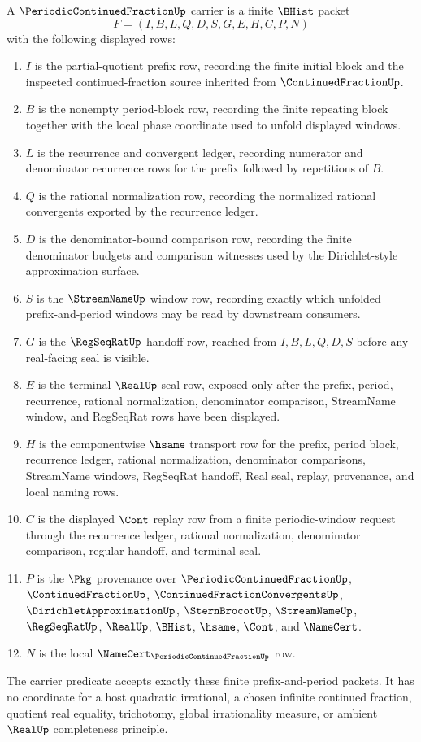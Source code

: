 \begin{definition}
\label{def:periodic-continued-fraction-carrier}
A $\PeriodicContinuedFractionUp$ carrier is a finite $\BHist$ packet
$$
F=(I,B,L,Q,D,S,G,E,H,C,P,N)
$$
with the following displayed rows:
\begin{enumerate}
\item $I$ is the partial-quotient prefix row, recording the finite initial block and the inspected continued-fraction source inherited from $\ContinuedFractionUp$.
\item $B$ is the nonempty period-block row, recording the finite repeating block together with the local phase coordinate used to unfold displayed windows.
\item $L$ is the recurrence and convergent ledger, recording numerator and denominator recurrence rows for the prefix followed by repetitions of $B$.
\item $Q$ is the rational normalization row, recording the normalized rational convergents exported by the recurrence ledger.
\item $D$ is the denominator-bound comparison row, recording the finite denominator budgets and comparison witnesses used by the Dirichlet-style approximation surface.
\item $S$ is the $\StreamNameUp$ window row, recording exactly which unfolded prefix-and-period windows may be read by downstream consumers.
\item $G$ is the $\RegSeqRatUp$ handoff row, reached from $I,B,L,Q,D,S$ before any real-facing seal is visible.
\item $E$ is the terminal $\RealUp$ seal row, exposed only after the prefix, period, recurrence, rational normalization, denominator comparison, StreamName window, and RegSeqRat rows have been displayed.
\item $H$ is the componentwise $\hsame$ transport row for the prefix, period block, recurrence ledger, rational normalization, denominator comparisons, StreamName windows, RegSeqRat handoff, Real seal, replay, provenance, and local naming rows.
\item $C$ is the displayed $\Cont$ replay row from a finite periodic-window request through the recurrence ledger, rational normalization, denominator comparison, regular handoff, and terminal seal.
\item $P$ is the $\Pkg$ provenance over $\PeriodicContinuedFractionUp$, $\ContinuedFractionUp$, $\ContinuedFractionConvergentsUp$, $\DirichletApproximationUp$, $\SternBrocotUp$, $\StreamNameUp$, $\RegSeqRatUp$, $\RealUp$, $\BHist$, $\hsame$, $\Cont$, and $\NameCert$.
\item $N$ is the local $\NameCert_{\PeriodicContinuedFractionUp}$ row.
\end{enumerate}
The carrier predicate accepts exactly these finite prefix-and-period packets. It has no coordinate for a host quadratic irrational, a chosen infinite continued fraction, quotient real equality, trichotomy, global irrationality measure, or ambient $\RealUp$ completeness principle.
\end{definition}

